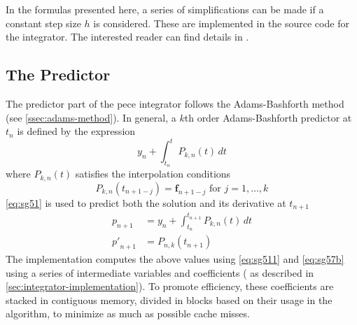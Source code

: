 In the formulas presented here, a series of simplifications can be made if a 
constant step size $h$ is considered. These are implemented in the source code for 
the integrator. The interested reader can find details in \cite{Shampine1975}.

\iffalse
\cite{Shampine1975}:
The overhead in these codes is rather high, partly because of the methods
and partly because of the features they provide. For example, DE detects
and deals with discontinuities; it detects and deals with moderate stiffness;
it detects and tells the user of severe stiffness; it detects requests for very
high accuracy and switches on propagated roundoff controls; it detects
requests for more accuracy than is possible on the machine being used and
tells the user what is possible; it is, for practical purposes, independent
of the number and location of output points; it monitors the work being
expended; it allows the user to change direction without restarting; and
it is extremely efficient in terms of function evaluations. 
\fi

\subsection{The Predictor}\label{ssec:integrator-predictor}
The predictor part of the \gls{pece} integrator follows the Adams-Bashforth 
method (see \autoref{ssec:adams-method}). In general, a $k$th order Adams-Bashforth 
predictor at $t_n$ is defined by the expression 
\begin{equation}\label{eq:sg51}
  y_n + \int_{t_n}^{t} P_{k,n}(t) \,dt
\end{equation}
where $P_{k,n}(t)$ satisfies the interpolation conditions
\begin{equation}\label{eq:sg51b}
  P_{k,n}(t_{n+1-j}) = \bm{f}_{n+1-j} \text{ for } j=1,\dots ,k
\end{equation}
\autoref{eq:sg51} is used to predict both the solution and its derivative at 
$t_{n+1}$
\begin{align}
  p_{n+1}    &= y_n + \int_{t_n}^{t_{n+1}}  P_{k,n} (t) \,dt \label{eq:sg52a}\\
  {p'}_{n+1} &= P_{n,k}(t_{n+1}) \label{eq:sg52b}
\end{align}
The implementation computes the above values using \autoref{eq:sg511} and 
\autoref{eq:sg57b} using a series of intermediate variables and coefficients (
as described in \autoref{sec:integrator-implementation}). To promote efficiency, 
these coefficients are stacked in contiguous memory, divided in blocks based on 
their usage in the algorithm, to minimize as much as possible cache misses.

